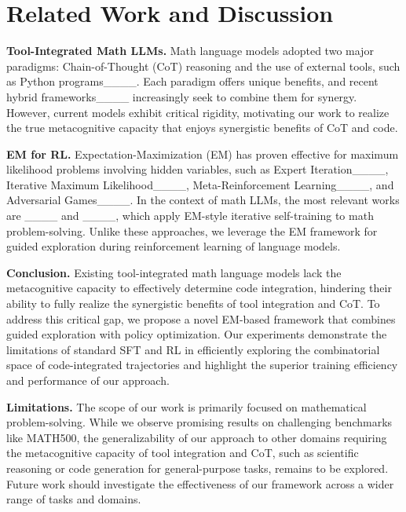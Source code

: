 \section{Related Work and Discussion}
\textbf{Tool-Integrated Math LLMs.} 
Math language models adopted two major paradigms: Chain-of-Thought (CoT) reasoning and the use of external tools, such as Python programs____. Each paradigm offers unique benefits, and recent hybrid frameworks____ increasingly seek to combine them for synergy. However, current models exhibit critical rigidity, motivating our work to realize the true metacognitive capacity that enjoys synergistic benefits of CoT and code. 

\noindent\textbf{EM for RL.} Expectation-Maximization (EM) has proven effective for maximum likelihood problems involving hidden variables, such as Expert Iteration____, Iterative Maximum Likelihood____, Meta-Reinforcement Learning____, and Adversarial Games____. In the context of math LLMs, the most relevant works are ____ and ____, which apply EM-style iterative self-training to math problem-solving. Unlike these approaches, we leverage the EM framework for guided exploration during reinforcement learning of language models.

\noindent\textbf{Conclusion.} Existing tool-integrated math language models lack the metacognitive capacity to effectively determine code integration, hindering their ability to fully realize the synergistic benefits of tool integration and CoT.  To address this critical gap, we propose a novel EM-based framework that combines guided exploration with policy optimization.  Our experiments demonstrate the limitations of standard SFT and RL in efficiently exploring the combinatorial space of code-integrated trajectories and highlight the superior training efficiency and performance of our approach.

\clearpage

\noindent\textbf{Limitations.} 
The scope of our work is primarily focused on mathematical problem-solving.  While we observe promising results on challenging benchmarks like MATH500, the generalizability of our approach to other domains requiring the metacognitive capacity of tool integration and CoT, such as scientific reasoning or code generation for general-purpose tasks, remains to be explored.  Future work should investigate the effectiveness of our framework across a wider range of tasks and domains.

